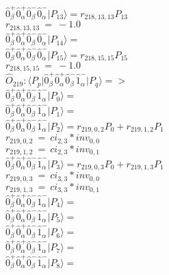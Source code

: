 \documentclass[14pt]{article}
\begin{document}
    $ \hat{0}_{\beta}^{+}\hat{0}_{\alpha}^{+}\hat{0}_{\beta}^{-}\hat{0}_{\alpha}^{-} \vert{P_{13}}\rangle = {r}_{218,13,13}P_{13} $ \\ 
    ${r}_{218,13,13}\ =\ -1.0 $ \\ 
    $ \hat{0}_{\beta}^{+}\hat{0}_{\alpha}^{+}\hat{0}_{\beta}^{-}\hat{0}_{\alpha}^{-} \vert{P_{14}}\rangle =  $ \\ 
    $ \hat{0}_{\beta}^{+}\hat{0}_{\alpha}^{+}\hat{0}_{\beta}^{-}\hat{0}_{\alpha}^{-} \vert{P_{15}}\rangle = {r}_{218,15,15}P_{15} $ \\ 
    ${r}_{218,15,15}\ =\ -1.0 $ \\ 
    
    $\hat{O}_{219}:  \langle{P_p}\vert \hat{0}_{\beta}^{+}\hat{0}_{\alpha}^{+}\hat{0}_{\beta}^{-}\hat{1}_{\alpha}^{-} \vert{P_q}\rangle => $ \\ 
    $ \hat{0}_{\beta}^{+}\hat{0}_{\alpha}^{+}\hat{0}_{\beta}^{-}\hat{1}_{\alpha}^{-} \vert{P_{0}}\rangle =  $ \\ 
    $ \hat{0}_{\beta}^{+}\hat{0}_{\alpha}^{+}\hat{0}_{\beta}^{-}\hat{1}_{\alpha}^{-} \vert{P_{1}}\rangle =  $ \\ 
    $ \hat{0}_{\beta}^{+}\hat{0}_{\alpha}^{+}\hat{0}_{\beta}^{-}\hat{1}_{\alpha}^{-} \vert{P_{2}}\rangle = {r}_{219,0,2}P_{0}+{r}_{219,1,2}P_{1} $ \\ 
    ${r}_{219,0,2}\ =\ {ci}_{2,3}*{inv}_{0,0} $ \\ 
    ${r}_{219,1,2}\ =\ {ci}_{2,3}*{inv}_{0,1} $ \\ 
    $ \hat{0}_{\beta}^{+}\hat{0}_{\alpha}^{+}\hat{0}_{\beta}^{-}\hat{1}_{\alpha}^{-} \vert{P_{3}}\rangle = {r}_{219,0,3}P_{0}+{r}_{219,1,3}P_{1} $ \\ 
    ${r}_{219,0,3}\ =\ {ci}_{3,3}*{inv}_{0,0} $ \\ 
    ${r}_{219,1,3}\ =\ {ci}_{3,3}*{inv}_{0,1} $ \\ 
    $ \hat{0}_{\beta}^{+}\hat{0}_{\alpha}^{+}\hat{0}_{\beta}^{-}\hat{1}_{\alpha}^{-} \vert{P_{4}}\rangle =  $ \\ 
    $ \hat{0}_{\beta}^{+}\hat{0}_{\alpha}^{+}\hat{0}_{\beta}^{-}\hat{1}_{\alpha}^{-} \vert{P_{5}}\rangle =  $ \\ 
    $ \hat{0}_{\beta}^{+}\hat{0}_{\alpha}^{+}\hat{0}_{\beta}^{-}\hat{1}_{\alpha}^{-} \vert{P_{6}}\rangle =  $ \\ 
    $ \hat{0}_{\beta}^{+}\hat{0}_{\alpha}^{+}\hat{0}_{\beta}^{-}\hat{1}_{\alpha}^{-} \vert{P_{7}}\rangle =  $ \\ 
    $ \hat{0}_{\beta}^{+}\hat{0}_{\alpha}^{+}\hat{0}_{\beta}^{-}\hat{1}_{\alpha}^{-} \vert{P_{8}}\rangle =  $ \\ 
\end{document}
